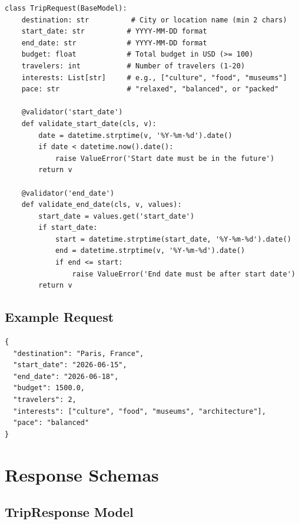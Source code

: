 \documentclass[12pt,a4paper]{report}
\begin{document}
\begin{lstlisting}[style=pythonstyle, caption={TripRequest Pydantic Model}]
class TripRequest(BaseModel):
    destination: str          # City or location name (min 2 chars)
    start_date: str          # YYYY-MM-DD format
    end_date: str            # YYYY-MM-DD format
    budget: float            # Total budget in USD (>= 100)
    travelers: int           # Number of travelers (1-20)
    interests: List[str]     # e.g., ["culture", "food", "museums"]
    pace: str                # "relaxed", "balanced", or "packed"
    
    @validator('start_date')
    def validate_start_date(cls, v):
        date = datetime.strptime(v, '%Y-%m-%d').date()
        if date < datetime.now().date():
            raise ValueError('Start date must be in the future')
        return v
    
    @validator('end_date')
    def validate_end_date(cls, v, values):
        start_date = values.get('start_date')
        if start_date:
            start = datetime.strptime(start_date, '%Y-%m-%d').date()
            end = datetime.strptime(v, '%Y-%m-%d').date()
            if end <= start:
                raise ValueError('End date must be after start date')
        return v
\end{lstlisting}

\subsection{Example Request}

\begin{lstlisting}[style=jsonStyle, caption={Example Trip Request JSON}]
{
  "destination": "Paris, France",
  "start_date": "2026-06-15",
  "end_date": "2026-06-18",
  "budget": 1500.0,
  "travelers": 2,
  "interests": ["culture", "food", "museums", "architecture"],
  "pace": "balanced"
}
\end{lstlisting}

\section{Response Schemas}

\subsection{TripResponse Model}
\end{document}
